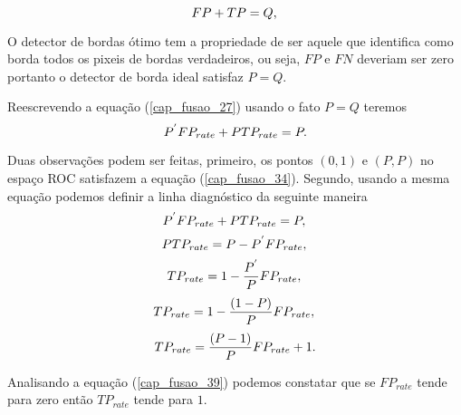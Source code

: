 \begin{equation}\label{cap_fusao_33}
      FP+TP = Q, \\
\end{equation}

O detector de bordas ótimo tem a propriedade de ser aquele que identifica como borda todos os pixeis de bordas verdadeiros, ou seja, $FP$ e $FN$ deveriam ser zero portanto o detector de borda ideal satisfaz $P=Q$. 


Reescrevendo a equação (\ref{cap_fusao_27}) usando o fato $P=Q$ teremos
\begin{equation}\label{cap_fusao_34}
     P^{'}FP_{rate}+P TP_{rate} = P. \\
\end{equation}

Duas observações podem ser feitas, primeiro, os pontos $(0,1)$ e $(P,P)$ no espaço ROC satisfazem a equação (\ref{cap_fusao_34}). Segundo, usando a mesma equação podemos definir a linha diagnóstico da seguinte maneira
\begin{equation}\label{cap_fusao_35}
     P^{'}FP_{rate}+P TP_{rate} = P, \\
\end{equation}
\begin{equation}\label{cap_fusao_36}
     P TP_{rate} = P - P^{'}FP_{rate}, \\
\end{equation}
\begin{equation}\label{cap_fusao_37}
    TP_{rate} = 1 - \frac{P^{'}}{P}FP_{rate}, \\
\end{equation}
\begin{equation}\label{cap_fusao_38}
    TP_{rate} = 1 - \frac{(1-P)}{P}FP_{rate}, \\
\end{equation}
\begin{equation}\label{cap_fusao_39}
    TP_{rate} = \frac{(P-1)}{P}FP_{rate} + 1. \\
\end{equation}

Analisando a equação (\ref{cap_fusao_39}) podemos constatar que se $FP_{rate}$ tende para zero então $TP_{rate}$ tende para $1$. 

